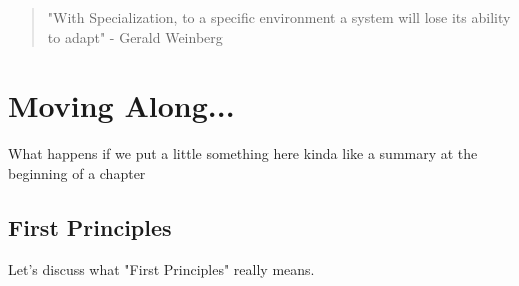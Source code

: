 \documentclass[12pt,A5]{report}
\begin{document}
\begin{quote}
"With Specialization, to a specific environment a system will lose its ability to adapt" - Gerald Weinberg

\end{quote}


\chapter{Moving Along...}

What happens if we put a little something here kinda like a summary at the beginning of a chapter

\section{First Principles}

Let's discuss what "First Principles" really means.
\end{document}
